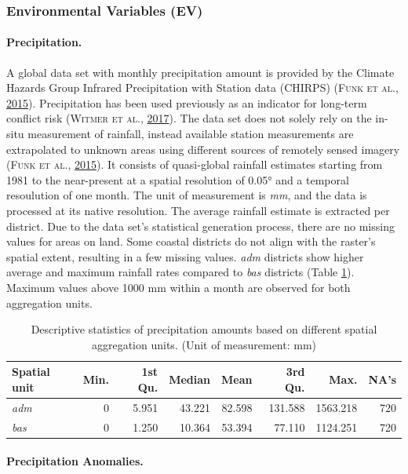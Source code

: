 \documentclass[a4paper,11pt]{article}
\begin{document}
\hypertarget{environmental-variables-ev}{%
\subsubsection{Environmental Variables (EV)}\label{environmental-variables-ev}}

\hypertarget{precipitation.}{%
\paragraph{Precipitation.}\label{precipitation.}}

A global data set with monthly precipitation amount is provided by the Climate Hazards
Group Infrared Precipitation with Station data (CHIRPS) \textsc{(\textnormal{\textsc{Funk} \textsc{et al.}}, \textnormal{\protect\hyperlink{ref-funk2015}{2015}})}.
Precipitation has been used previously as an indicator for long-term conflict risk \textsc{(\textnormal{\textsc{Witmer} \textsc{et al.}}, \textnormal{\protect\hyperlink{ref-witmer2017}{2017}})}.
The data set does not solely rely on the in-situ measurement of rainfall, instead
available station measurements are extrapolated to unknown areas using different sources
of remotely sensed imagery \textsc{(\textnormal{\textsc{Funk} \textsc{et al.}}, \textnormal{\protect\hyperlink{ref-funk2015}{2015}})}. It consists of quasi-global rainfall estimates
starting from 1981 to the near-present at a spatial resolution of 0.05° and a
temporal resoulution of one month. The unit of measurement is \emph{mm}, and the data is
processed at its native resolution. The average rainfall estimate is extracted
per district. Due to the data set's statistical generation process, there are no
missing values for areas on land. Some coastal districts do not align with the
raster's spatial extent, resulting in a few missing values. \emph{adm} districts show
higher average and maximum rainfall rates compared to \emph{bas} districts
(Table \ref{tab:02-data-prec}). Maximum values above 1000 mm within a month are
observed for both aggregation units.
\begin{table}[H]

\caption[Descriptive statistics of precipitation amounts.]{\label{tab:02-data-prec}Descriptive statistics of precipitation amounts based on different spatial
               aggregation units. (Unit of measurement: mm)}
\centering
\fontsize{10}{12}\selectfont
\begin{tabular}[t]{lrrrrrrr}
\toprule
Spatial unit & Min. & 1st Qu. & Median & Mean & 3rd Qu. & Max. & NA's\\
\midrule
\textit{adm} & 0 & 5.951 & 43.221 & 82.598 & 131.588 & 1563.218 & 720\\
\textit{bas} & 0 & 1.250 & 10.364 & 53.394 & 77.110 & 1124.251 & 720\\
\bottomrule
\end{tabular}
\end{table}
\hypertarget{precipitation-anomalies.}{%
\paragraph{Precipitation Anomalies.}\label{precipitation-anomalies.}}
\end{document}
